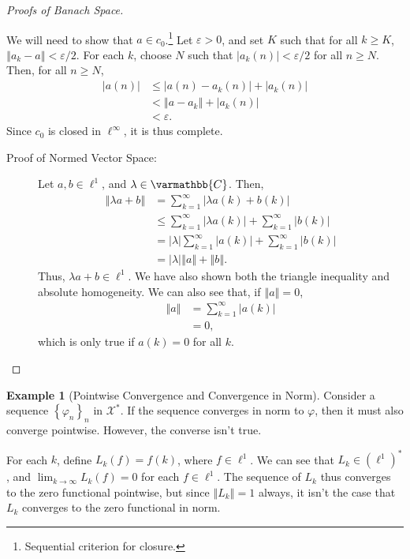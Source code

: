 \documentclass[12pt]{extarticle}
\newcommand{\C}{\mathbb{C}}
\newcommand{\norm}[1]{\left\Vert #1\right\Vert}
\newcommand{\set}[1]{\left\{#1\right\}}
\newcommand{\ve}{\varepsilon}
\theoremstyle{plain}
\theoremstyle{definition}
\newtheorem*{example}{Example}
\theoremstyle{note}
\renewcommand*{\mathbb}[1]{\varmathbb{#1}}
\renewcommand{\newline}{\hfill\break}
\begin{document}
\begin{proof}[Proofs of Banach Space]
\begin{description}[font = \normalfont]
\begin{description}
          We will need to show that $a\in c_0$.\footnote{Sequential criterion for closure.} Let $\ve > 0$, and set $K$ such that for all $k\geq K$, $\norm{a_k - a} < \ve/2$. For each $k$, choose $N$ such that $|a_k(n)| < \ve/2$ for all $n \geq N$. Then, for all $n\geq N$,
          \begin{align*}
            \left\vert a(n) \right\vert &\leq \left\vert a(n) - a_k(n) \right\vert + \left\vert a_k(n) \right\vert\\
                                        &< \norm{a - a_k} + \left\vert a_k(n) \right\vert\\
                                        &< \ve.
          \end{align*}
          Since $c_0$ is closed in $\ell^{\infty}$, it is thus complete.
      \end{description}
    \item[$\ell^{1}$:]\hfill
      \begin{description}
        \item[Proof of Normed Vector Space:] Let $a,b\in \ell^{1}$, and $\lambda \in \C$. Then,
          \begin{align*}
            \norm{\lambda a + b} &= \sum_{k=1}^{\infty}\left\vert \lambda a(k) + b(k) \right\vert\\
                                 &\leq \sum_{k=1}^{\infty}\left\vert \lambda a(k) \right\vert + \sum_{k=1}^{\infty}\left\vert b(k) \right\vert\\
                                 &= |\lambda|\sum_{k=1}^{\infty}\left\vert a(k) \right\vert + \sum_{k=1}^{\infty}\left\vert b(k) \right\vert\\
                                 &= |\lambda|\norm{a} + \norm{b}.
          \end{align*}
          Thus, $\lambda a + b\in \ell^{1}$. We have also shown both the triangle inequality and absolute homogeneity. We can also see that, if $\norm{a} = 0$,
          \begin{align*}
            \norm{a} &= \sum_{k=1}^{\infty}\left\vert a(k) \right\vert\\
            &= 0,
          \end{align*}
          which is only true if $a(k) = 0$ for all $k$.
      \end{description}
  \end{description}
\end{proof}
\begin{example}[Pointwise Convergence and Convergence in Norm]
  Consider a sequence $\set{\varphi_n}_n$ in $\mathcal{X}^{\ast}$. If the sequence converges in norm to $\varphi$, then it must also converge pointwise. However, the converse isn't true.\newline

  For each $k$, define $L_k(f) = f(k)$, where $f\in \ell^{1}$. We can see that $L_k \in \left(\ell^{1}\right)^{\ast}$, and $\lim_{k\rightarrow\infty}L_k(f) = 0$ for each $f\in \ell^{1}$. The sequence of $L_k$ thus converges to the zero functional pointwise, but since $\norm{L_k} = 1$ always, it isn't the case that $L_k$ converges to the zero functional in norm.
\end{example}
\end{document}
